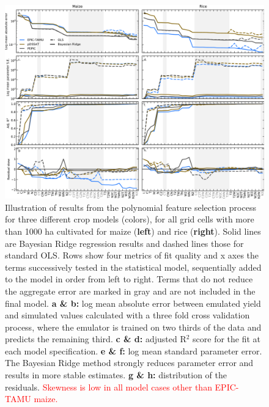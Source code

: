 \documentclass[gmd, manuscript]{copernicus} %
\begin{document}
\begin{figure}[ht]
\centering
   \includegraphics[width=16.3cm]{figures/model_select_maize_rice.png}
	\caption{
    Illustration of results from the polynomial feature selection process for three different crop models (colors), for all grid cells with more than 1000 ha cultivated for maize (\textbf{left}) and rice (\textbf{right}). 
    Solid lines are Bayesian Ridge regression results and dashed lines those for standard OLS. Rows show four metrics of fit quality and x axes the terms successively tested in the statistical model, sequentially added to the model in order from left to right.
    Terms that do not reduce the aggregate error are marked in {\color{dark-gray} gray} and are not included in the final model. 
    \textbf{a \& b:} log mean absolute error between emulated yield and simulated values calculated with a three fold cross validation process, where the emulator is trained on two thirds of the data and predicts the remaining third.
    \textbf{c \& d:} adjusted R$^2$ score for the fit at each model specification. 
    \textbf{e \& f:} log mean standard parameter error. The Bayesian Ridge method strongly reduces parameter error and results in more stable estimates. 
	\textbf{g \& h:} distribution of the residuals.  \textcolor{red}{Skewness is low in all model cases other than EPIC-TAMU maize.}
	}
   \label{fig:features}
\end{figure}
\end{document}
